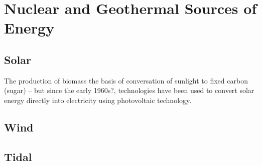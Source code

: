 \chapter{Nuclear and Geothermal Sources of Energy}\label{ch:non_GHG}

\section{Solar}

The production of biomass the basis of conversation of sunlight to fixed carbon (sugar) -- but since the early 1960s?, technologies have been used to convert solar energy directly into electricity using photovoltaic technology. 

\section{Wind}

\section{Tidal}




